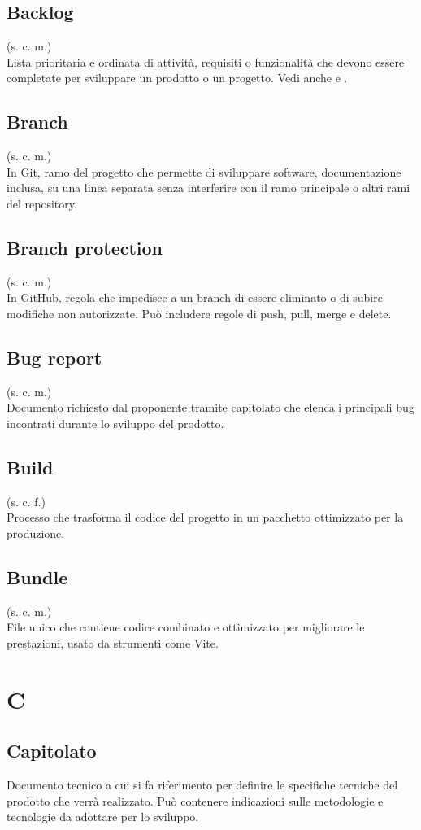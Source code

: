 \subsection{Backlog}
(s. c. m.)\\
Lista prioritaria e ordinata di attività, requisiti o funzionalità che devono
essere completate per sviluppare un prodotto o un progetto.
Vedi anche  e .
\subsection{Branch}
(s. c. m.)\\
In Git, ramo del progetto che permette di sviluppare software, documentazione inclusa, su una linea separata
senza interferire con il ramo principale o altri rami del repository.
\subsection{Branch protection}
\label{Branch protection}
(s. c. m.)\\
In GitHub, regola che impedisce a un branch di essere eliminato o di subire modifiche
non autorizzate. Può includere regole di push, pull, merge e delete.
\subsection{Bug report}
(s. c. m.)\\
Documento richiesto dal proponente tramite capitolato che elenca i principali
bug incontrati durante lo sviluppo del prodotto. 
\subsection{Build}
(s. c. f.)\\
Processo che trasforma il codice del progetto in un pacchetto ottimizzato per la produzione.
\subsection{Bundle}
(s. c. m.)\\
File unico che contiene codice combinato e ottimizzato per migliorare le prestazioni, usato da
strumenti come Vite.
\pagebreak
\section{C}
\subsection{Capitolato}
Documento tecnico a cui si fa riferimento per definire le specifiche tecniche
del prodotto che verrà realizzato. Può contenere indicazioni sulle metodologie
e tecnologie da adottare per lo sviluppo.
